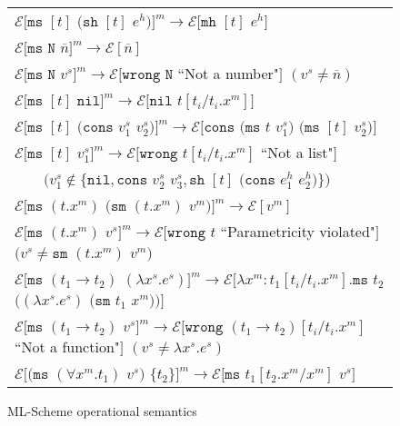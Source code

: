 \begin{figure}[p]
\centering
\begin{tabular}{l}

$\mathscr{E}[\mathtt{ms}$ $[t]$ $(\mathtt{sh}$ $[t]$ $e^h)]^m\rightarrow\mathscr{E}[\mathtt{mh}$ $[t]$ $e^h]$ \\

$\mathscr{E}[\mathtt{ms}$ $\mathtt{N}$ $\overline{n}]^m\rightarrow\mathscr{E}[\overline{n}]$ \\

$\mathscr{E}[\mathtt{ms}$ $\mathtt{N}$ $v^s]^m\rightarrow\mathscr{E}[\mathtt{wrong}$ $\mathtt{N}$ ``Not a number"$]$ $(v^s\neq\overline{n})$ \\

$\mathscr{E}[\mathtt{ms}$ $[t]$ $\mathtt{nil}]^m\rightarrow\mathscr{E}[\mathtt{nil}$ $t[t_i/t_i.x^m]]$ \\

$\mathscr{E}[\mathtt{ms}$ $[t]$ $(\mathtt{cons}$ $v^s_1$ $v^s_2)]^m\rightarrow\mathscr{E}[\mathtt{cons}$ $(\mathtt{ms}$ $t$ $v^s_1)$ $(\mathtt{ms}$ $[t]$ $v^s_2)]$ \\

$\mathscr{E}[\mathtt{ms}$ $[t]$ $v^s_1]^m\rightarrow\mathscr{E}[\mathtt{wrong}$ $t[t_i/t_i.x^m]$ ``Not a list"$]$ \\

$\quad\quad(v^s_1\not\in\lbrace\mathtt{nil},\mathtt{cons}$ $v^s_2$ $v^s_3,\mathtt{sh}$ $[t]$ $(\mathtt{cons}$ $e^h_1$ $e^h_2)\rbrace)$ \\

$\mathscr{E}[\mathtt{ms}$ $(t.x^m)$ $(\mathtt{sm}$ $(t.x^m)$ $v^m)]^m\rightarrow\mathscr{E}[v^m]$ \\

$\mathscr{E}[\mathtt{ms}$ $(t.x^m)$ $v^s]^m\rightarrow\mathscr{E}[\mathtt{wrong}$ $t$ ``Parametricity violated"$]$ $(v^s\neq \mathtt{sm}$ $(t.x^m)$ $v^m)$ \\

$\mathscr{E}[\mathtt{ms}$ $(t_1\rightarrow t_2)$ $(\lambda x^s.e^s)]^m\rightarrow\mathscr{E}[\lambda x^m:t_1[t_i/t_i.x^m].\mathtt{ms}$ $t_2$ $((\lambda x^s.e^s)$ $(\mathtt{sm}$ $t_1$ $x^m))]$ \\

$\mathscr{E}[\mathtt{ms}$ $(t_1\rightarrow t_2)$ $v^s]^m\rightarrow\mathscr{E}[\mathtt{wrong}$ $(t_1\rightarrow t_2)[t_i/t_i.x^m]$ ``Not a function"$]$ $(v^s\neq\lambda x^s.e^s)$ \\

$\mathscr{E}[(\mathtt{ms}$ $(\forall x^m.t_1)$ $v^s)$ $\lbrace t_2\rbrace]^m\rightarrow\mathscr{E}[\mathtt{ms}$ $t_1[t_2.x^m/x^m]$ $v^s]$

\end{tabular}
\caption{ML-Scheme operational semantics}
\label{msos}
\end{figure}